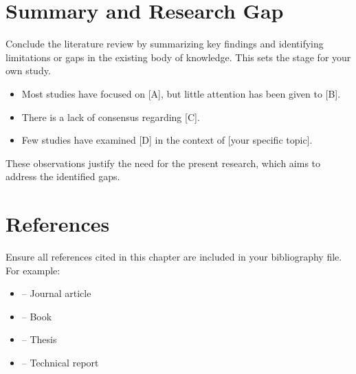 \section{Summary and Research Gap}
Conclude the literature review by summarizing key findings and identifying limitations or gaps in the existing body of knowledge. This sets the stage for your own study.

\begin{itemize}
    \item Most studies have focused on [A], but little attention has been given to [B].
    \item There is a lack of consensus regarding [C].
    \item Few studies have examined [D] in the context of [your specific topic].
\end{itemize}

These observations justify the need for the present research, which aims to address the identified gaps.

\section{References}
Ensure all references cited in this chapter are included in your bibliography file. For example:
\begin{itemize}
    \item \cite{Si86} – Journal article
    \item \cite{ro95} – Book
    \item \cite{Het16} – Thesis
    \item \cite{Te80} – Technical report
\end{itemize}